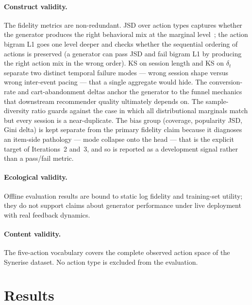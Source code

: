 \documentclass[sigconf,nonacm]{acmart}
\begin{document}
\paragraph{Construct validity.}
The fidelity metrics are non-redundant. JSD over action
types captures whether the generator produces the right behavioral mix
at the marginal level~\cite{lin1991jsd}; the action bigram L1 goes one
level deeper and checks whether the sequential ordering of actions is
preserved (a generator can pass JSD and fail bigram L1 by producing the
right action mix in the wrong order). KS on session length and KS on
$\delta_t$ separate two distinct temporal failure modes — wrong session
shape versus wrong inter-event pacing — that a single aggregate would
hide. The conversion-rate and cart-abandonment deltas anchor the
generator to the funnel mechanics that downstream recommender quality
ultimately depends on. The sample-diversity ratio guards against the
case in which all distributional marginals match but every session is a
near-duplicate. The bias group (coverage, popularity JSD, Gini delta) is
kept separate from the primary fidelity claim because it diagnoses an
item-side pathology — mode collapse onto the head — that is the explicit
target of Iterations~2 and~3, and so is reported as a development signal
rather than a pass/fail metric.

\paragraph{Ecological validity.}
Offline evaluation results are bound to static log fidelity and
training-set utility; they do not support claims about generator
performance under live deployment with real feedback dynamics.

\paragraph{Content validity.}
The five-action vocabulary covers the complete observed action space of
the Synerise dataset. No action type is excluded from the evaluation.

\section{Results}
\label{sec:results}
\end{document}
